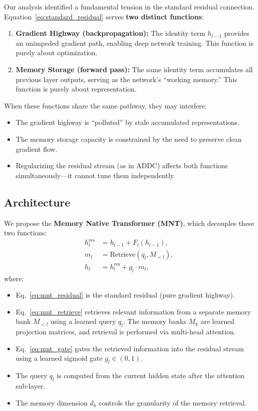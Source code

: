 \documentclass[10pt]{article}
\begin{document}
Our analysis identified a fundamental tension in the standard residual connection. Equation~\eqref{eq:standard_residual} serves \textbf{two distinct functions}:

\begin{enumerate}[leftmargin=*,itemsep=2pt]
    \item \textbf{Gradient Highway (backpropagation):} The identity term $h_{l-1}$ provides an unimpeded gradient path, enabling deep network training. This function is purely about optimization.
    \item \textbf{Memory Storage (forward pass):} The same identity term accumulates all previous layer outputs, serving as the network's ``working memory.'' This function is purely about representation.
\end{enumerate}

When these functions share the same pathway, they may interfere:
\begin{itemize}[leftmargin=*,itemsep=2pt]
    \item The gradient highway is ``polluted'' by stale accumulated representations.
    \item The memory storage capacity is constrained by the need to preserve clean gradient flow.
    \item Regularizing the residual stream (as in ADDC) affects both functions simultaneously---it cannot tune them independently.
\end{itemize}

\subsection{Architecture}

We propose the \textbf{Memory Native Transformer (MNT)}, which decouples these two functions:
\begin{align}
    h_l^{\text{res}} &= h_{l-1} + F_l(h_{l-1}), \label{eq:mnt_residual} \\
    m_l &= \text{Retrieve}(q_l, M_{<l}), \label{eq:mnt_retrieve} \\
    h_l &= h_l^{\text{res}} + g_l \cdot m_l, \label{eq:mnt_gate}
\end{align}
where:
\begin{itemize}[leftmargin=*,itemsep=2pt]
    \item Eq.~\eqref{eq:mnt_residual} is the standard residual (pure gradient highway).
    \item Eq.~\eqref{eq:mnt_retrieve} retrieves relevant information from a separate memory bank $M_{<l}$ using a learned query $q_l$. The memory banks $M_k$ are learned projection matrices, and retrieval is performed via multi-head attention.
    \item Eq.~\eqref{eq:mnt_gate} gates the retrieved information into the residual stream using a learned sigmoid gate $g_l \in (0,1)$.
    \item The query $q_l$ is computed from the current hidden state after the attention sub-layer.
    \item The memory dimension $d_k$ controls the granularity of the memory retrieval.
\end{itemize}
\end{document}
